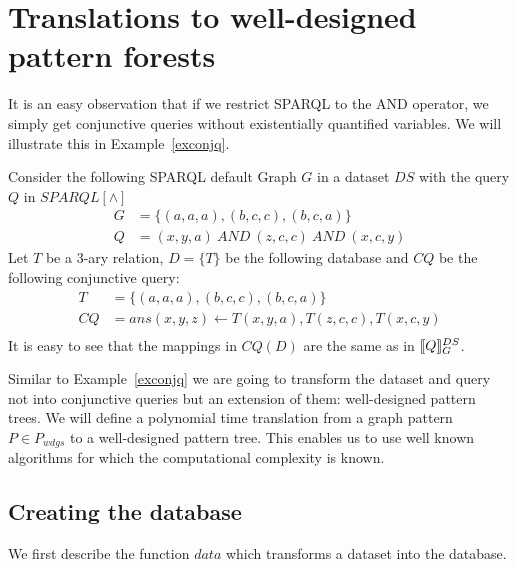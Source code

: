 \section{Translations to well-designed pattern forests}
It is an easy observation that if we restrict SPARQL to the AND operator, we
simply get conjunctive queries without existentially quantified variables.
We will illustrate this in Example~\ref{exconjq}. 
\begin{example}\label{exconjq}
	Consider the following SPARQL default Graph $G$ in a dataset $DS$ with the query $Q$ in $SPARQL[\land]$
	\begin{align*}
		G &=\{ (a,a,a), (b,c,c), (b,c,a)  \}\\
		Q &= (x,y,a) \ AND \ (z,c,c) \ AND \ (x,c,y)
	\end{align*}
	Let $T$ be a 3-ary relation, $D = \{ T \}$ be the following database and
	$CQ$ be the following 
	conjunctive query: 
	\begin{align*}
		T &= \{ (a,a,a), (b,c,c), (b,c,a)\}\\
		CQ &= ans(x,y,z) \leftarrow T(x,y,a), T(z,c,c), T(x,c,y)\\
	\end{align*}
	It is easy to see that the mappings in $CQ(D)$ are the same as in $\llbracket Q
	\rrbracket_G^{DS}$.
\end{example}
Similar to Example~\ref{exconjq} we are going to transform the dataset and query 
not into conjunctive queries but an extension of them: well-designed pattern
trees. We 
will define a polynomial time translation from a graph pattern $P \in P_{wdgs}$
to a well-designed pattern tree. This enables us to use well known algorithms 
for which the computational complexity is known. 

\subsection{Creating the database}
We first describe the function $data$ which transforms a dataset into the
database.

